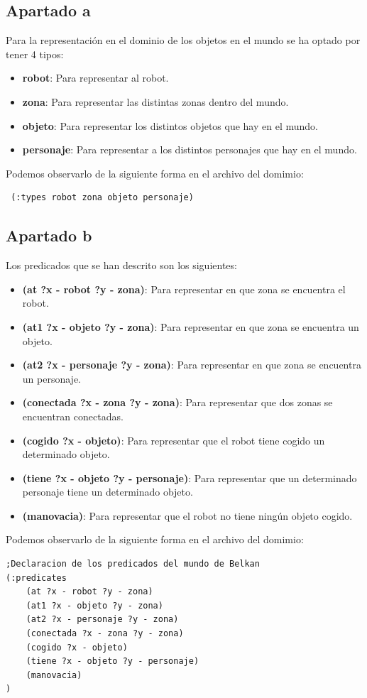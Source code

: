 \subsection{Apartado a}
Para la representación en el dominio de los objetos en el mundo se ha optado por tener 4 tipos:
\begin{itemize}
	\item \textbf{robot}: Para representar al robot.
	\item \textbf{zona}: Para representar las distintas zonas dentro del mundo.
	\item \textbf{objeto}: Para representar los distintos objetos que hay en el mundo.
	\item \textbf{personaje}: Para representar a los distintos personajes que hay en el mundo.
\end{itemize}
Podemos observarlo de la siguiente forma en el archivo del domimio:
\begin{verbatim}
 (:types robot zona objeto personaje)
\end{verbatim}
\subsection{Apartado b}
Los predicados que se han descrito son los siguientes:
\begin{itemize}
	\item \textbf{(at ?x - robot ?y - zona)}: Para representar en que zona se encuentra el robot.
	\item \textbf{(at1 ?x - objeto ?y - zona)}: Para representar en que zona se encuentra un objeto.
	\item \textbf{(at2 ?x - personaje ?y - zona)}: Para representar en que zona se encuentra un personaje.
	\item \textbf{(conectada ?x - zona ?y - zona)}: Para representar que dos zonas se encuentran conectadas.
	\item \textbf{(cogido ?x - objeto)}: Para representar que el robot tiene cogido un determinado objeto.
	\item \textbf{(tiene ?x - objeto ?y - personaje)}: Para representar que un determinado personaje tiene un determinado objeto.
	\item \textbf{(manovacia)}: Para representar que el robot no tiene ningún objeto cogido.
\end{itemize}
Podemos observarlo de la siguiente forma en el archivo del domimio:
\begin{verbatim}
;Declaracion de los predicados del mundo de Belkan
(:predicates   
    (at ?x - robot ?y - zona)
    (at1 ?x - objeto ?y - zona)
    (at2 ?x - personaje ?y - zona)
    (conectada ?x - zona ?y - zona)
    (cogido ?x - objeto)
    (tiene ?x - objeto ?y - personaje)
    (manovacia)
)
\end{verbatim}
